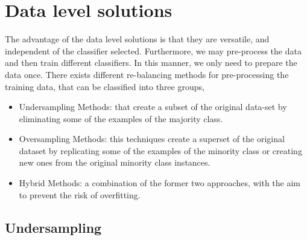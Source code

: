 \section{Data level solutions}
The advantage of the data level solutions is that they are  versatile, and independent of the classifier selected. Furthermore, we may pre-process the data and then train  different classifiers. In this manner, we only need to prepare the data once. There exists different re-balancing methods for pre-processing the training data, that can be classified into three groups,
\begin{itemize}
\item{Undersampling Methods: that create a subset of the original data-set by eliminating some of the examples of the majority class.}
\item{Oversampling Methods: this techniques create a superset of the original dataset by replicating some of the examples of the minority class or creating new ones from the original minority class instances.}
\item{Hybrid Methods: a combination of the former two approaches, with the aim to prevent the risk of overfitting.
}
\end{itemize}


\subsection{Undersampling}

